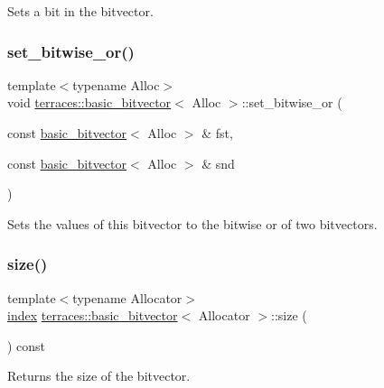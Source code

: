 Sets a bit in the bitvector. \mbox{\label{classterraces_1_1basic__bitvector_a3e071c2698f1e19765b3c968a80ea65e}} 
\subsubsection{\texorpdfstring{set\+\_\+bitwise\+\_\+or()}{set\_bitwise\_or()}}
{\footnotesize\ttfamily template$<$typename Alloc$>$ \\
void \hyperlink{classterraces_1_1basic__bitvector}{terraces\+::basic\+\_\+bitvector}$<$ Alloc $>$\+::set\+\_\+bitwise\+\_\+or (\begin{DoxyParamCaption}\item[{const \hyperlink{classterraces_1_1basic__bitvector}{basic\+\_\+bitvector}$<$ Alloc $>$ \&}]{fst,  }\item[{const \hyperlink{classterraces_1_1basic__bitvector}{basic\+\_\+bitvector}$<$ Alloc $>$ \&}]{snd }\end{DoxyParamCaption})}

Sets the values of this bitvector to the bitwise or of two bitvectors. \mbox{\label{classterraces_1_1basic__bitvector_a7a846347ea4c1c1f542ff3331307fdb9}} 
\subsubsection{\texorpdfstring{size()}{size()}}
{\footnotesize\ttfamily template$<$typename Allocator$>$ \\
\hyperlink{namespaceterraces_adbc33ccb543d1634e96d0eb02e472c77}{index} \hyperlink{classterraces_1_1basic__bitvector}{terraces\+::basic\+\_\+bitvector}$<$ Allocator $>$\+::size (\begin{DoxyParamCaption}{ }\end{DoxyParamCaption}) const\hspace{0.3cm}{\ttfamily [inline]}}

Returns the size of the bitvector. 

